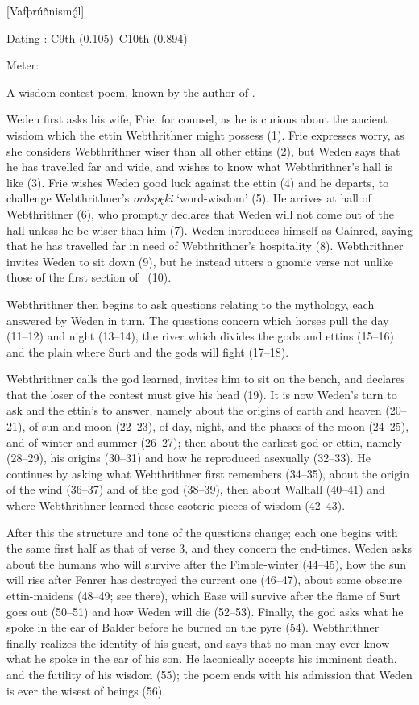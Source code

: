 [Vafþrúðnismǫ́l]

\begin{flushright}%
Dating \parencite{Sapp2022}: C9th (0.105)–C10th (0.894)

Meter: \Ljodahattr%
\end{flushright}%

A wisdom contest poem, known by the author of \Gylfaginning.

Weden first asks his wife, Frie, for counsel, as he is curious about the ancient wisdom which the ettin Webthrithner might possess (1). Frie expresses worry, as she considers Webthrithner wiser than all other ettins (2), but Weden says that he has travelled far and wide, and wishes to know what Webthrithner’s hall is like (3). Frie wishes Weden good luck against the ettin (4) and he departs, to challenge Webthrithner’s \emph{orðspęki} ‘word-wisdom’ (5). He arrives at hall of Webthrithner (6), who promptly declares that Weden will not come out of the hall unless he be wiser than him (7). Weden introduces himself as Gainred, saying that he has travelled far in need of Webthrithner’s hospitality (8). Webthrithner invites Weden to sit down (9), but he instead utters a gnomic verse not unlike those of the first section of \Havamal\ (10).

Webthrithner then begins to ask questions relating to the mythology, each answered by Weden in turn. The questions concern which horses pull the day (11–12) and night (13–14), the river which divides the gods and ettins (15–16) and the plain where Surt and the gods will fight (17–18).

Webthrithner calls the god learned, invites him to sit on the bench, and declares that the loser of the contest must give his head (19). It is now Weden’s turn to ask and the ettin’s to answer, namely about the origins of earth and heaven (20–21), of sun and moon (22–23), of day, night, and the phases of the moon (24–25), and of winter and summer (26–27); then about the earliest god or ettin, namely  (28–29), his origins (30–31) and how he reproduced asexually (32–33). He continues by asking what Webthrithner first remembers (34–35), about the origin of the wind (36–37) and of the god  (38–39), then about Walhall (40–41) and where Webthrithner learned these esoteric pieces of wisdom (42–43).

After this the structure and tone of the questions change; each one begins with the same first half as that of verse 3, and they concern the end-times. Weden asks about the humans who will survive after the Fimble-winter (44–45), how the sun will rise after Fenrer has destroyed the current one (46–47), about some obscure ettin-maidens (48–49; see there), which Ease will survive after the flame of Surt goes out (50–51) and how Weden will die (52–53). Finally, the god asks what he spoke in the ear of Balder before he burned on the pyre (54). Webthrithner finally realizes the identity of his guest, and says that no man may ever know what he spoke in the ear of his son. He laconically accepts his imminent death, and the futility of his wisdom (55); the poem ends with his admission that Weden is ever the wisest of beings (56).

